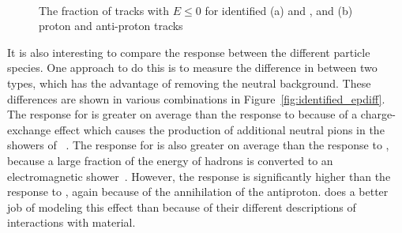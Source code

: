 \begin{figure}[h]
\centering
{}
~
\caption{ The fraction of tracks with $E \leq 0$ for identified (a) \pip and \pim, and (b) proton and anti-proton tracks}
\label{fig:identified_zero_fraction}
\end{figure}

It is also interesting to compare the response between the different particle species.
One approach to do this is to measure the difference in \epav between two types, which has the advantage of removing the neutral background.
These differences are shown in various combinations in Figure~\ref{fig:identified_epdiff}. 
The response for \pip is greater on average than the response to \pim because of a charge-exchange effect which causes the production of additional neutral pions in the showers of \pip~\cite{particlebeam}. 
The response for \pip is also greater on average than the response to \pP, because a large fraction of the energy of \pip hadrons is converted to an electromagnetic shower~\cite{physicsg,TileTB}. 
However, the \pAP response is significantly higher than the response to \pim, again because of the annihilation of the antiproton.
\FTFP does a better job of modeling this effect than \QGSP because of their different descriptions of \pAP interactions with material.


